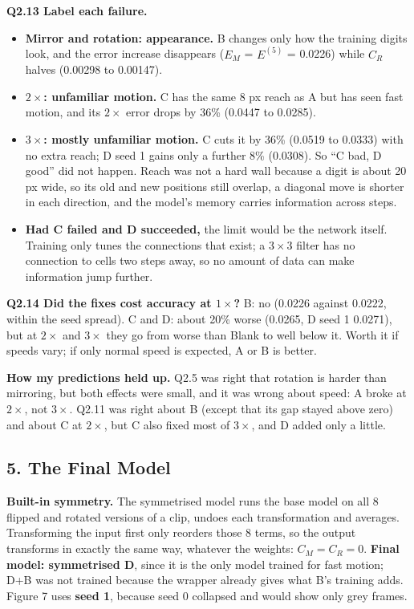 \documentclass[10pt,a4paper]{article}
\newcommand{\q}[1]{\textbf{#1}}
\begin{document}
\q{Q2.13 Label each failure.}
\begin{itemize}
  \item \textbf{Mirror and rotation: appearance.} B changes only how the training digits look, and the error increase disappears ($E_M$ = $E^{(5)}$ = 0.0226) while $C_R$ halves (0.00298 to 0.00147).
  \item \textbf{$2\times$: unfamiliar motion.} C has the same 8 px reach as A but has seen fast motion, and its $2\times$ error drops by 36\% (0.0447 to 0.0285).
  \item \textbf{$3\times$: mostly unfamiliar motion.} C cuts it by 36\% (0.0519 to 0.0333) with no extra reach; D seed 1 gains only a further 8\% (0.0308). So ``C bad, D good'' did not happen. Reach was not a hard wall because a digit is about 20 px wide, so its old and new positions still overlap, a diagonal move is shorter in each direction, and the model's memory carries information across steps.
  \item \textbf{Had C failed and D succeeded,} the limit would be the network itself. Training only tunes the connections that exist; a $3 \times 3$ filter has no connection to cells two steps away, so no amount of data can make information jump further.
\end{itemize}

\q{Q2.14 Did the fixes cost accuracy at $1\times$?} B: no (0.0226 against 0.0222, within the seed spread). C and D: about 20\% worse (0.0265, D seed 1 0.0271), but at $2\times$ and $3\times$ they go from worse than Blank to well below it. Worth it if speeds vary; if only normal speed is expected, A or B is better.

\textbf{How my predictions held up.} Q2.5 was right that rotation is harder than mirroring, but both effects were small, and it was wrong about speed: A broke at $2\times$, not $3\times$. Q2.11 was right about B (except that its gap stayed above zero) and about C at $2\times$, but C also fixed most of $3\times$, and D added only a little.

\subsection{5. The Final Model}

\textbf{Built-in symmetry.} The symmetrised model runs the base model on all 8 flipped and rotated versions of a clip, undoes each transformation and averages. Transforming the input first only reorders those 8 terms, so the output transforms in exactly the same way, whatever the weights: $C_M = C_R = 0$. \textbf{Final model: symmetrised D}, since it is the only model trained for fast motion; D+B was not trained because the wrapper already gives what B's training adds. Figure 7 uses \textbf{seed 1}, because seed 0 collapsed and would show only grey frames.
\end{document}
